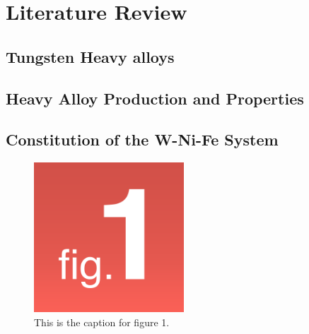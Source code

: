 
\chapter{Literature Review}

\label{Chapter2}


\section{Tungsten Heavy alloys}
\label{Tungsten Heavy alloys}

\lipsum[2]

\section{Heavy Alloy Production and Properties}
\label{Heavy Alloy Production and Properties}

\lipsum[2]


\section{Constitution of the W-Ni-Fe System}

\lipsum[2]

\begin{figure}
    \centering
    \includegraphics[width=0.5\textwidth]{images/Figure 1.png}
    \caption{This is the caption for figure 1.}
    \label{figure:chap2_Figure_2}
\end{figure}



